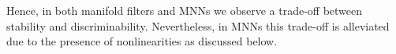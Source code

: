 Hence, in both manifold filters and MNNs we observe a trade-off between stability and discriminability. Nevertheless, in MNNs this trade-off is alleviated due to the presence of nonlinearities as discussed below.

 

